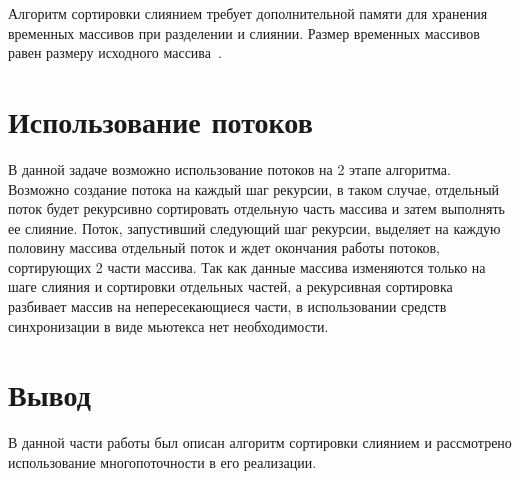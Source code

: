 Алгоритм сортировки слиянием требует дополнительной памяти для хранения временных массивов при разделении и слиянии. Размер временных массивов равен размеру исходного массива~\cite{merge-sort}.


\section{Использование потоков}
В данной задаче возможно использование потоков на 2 этапе алгоритма. Возможно создание  потока на каждый шаг рекурсии, в таком случае, 
отдельный поток будет рекурсивно сортировать отдельную часть массива  и затем выполнять ее слияние. Поток, запустивший следующий шаг рекурсии, 
выделяет на каждую половину массива отдельный поток и ждет окончания работы потоков, сортирующих 2 части массива. Так как данные массива изменяются только на шаге слияния и сортировки отдельных частей, а рекурсивная сортировка
разбивает массив на непересекающиеся части, в использовании средств синхронизации в виде мьютекса нет необходимости.

\section*{Вывод}
В данной части работы был описан алгоритм сортировки слиянием и рассмотрено использование многопоточности в его реализации.






